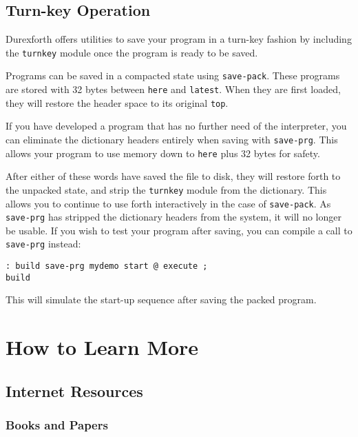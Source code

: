 \subsection{Turn-key Operation}

Durexforth offers utilities to save your program in a turn-key fashion by
including the \texttt{turnkey} module once the program is ready to be
saved.

Programs can be saved in a compacted state using \texttt{save-pack}. These
programs are stored with 32 bytes between \texttt{here} and
\texttt{latest}. When they are first loaded, they will restore the header
space to its original \texttt{top}.

If you have developed a program that has no further need of the
interpreter, you can eliminate the dictionary headers entirely when saving
with \texttt{save-prg}. This allows your program to use memory down to
\texttt{here} plus 32 bytes for safety.

After either of these words have saved the file to disk, they will restore
forth to the unpacked state, and strip the \texttt{turnkey} module from the
dictionary. This allows you to continue to use forth interactively in the
case of \texttt{save-pack}. As \texttt{save-prg} has stripped the
dictionary headers from the system, it will no longer be usable. If you
wish to test your program after saving, you can compile a call to
\texttt{save-prg} instead:
\begin{verbatim}
: build save-prg mydemo start @ execute ;
build
\end{verbatim}
This will simulate the start-up sequence after saving the packed program.

\section{How to Learn More}

\subsection{Internet Resources}

\subsubsection{Books and Papers}

